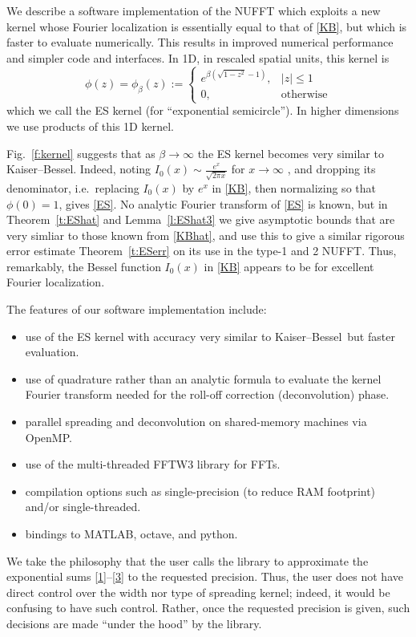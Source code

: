 \documentclass[10pt]{article}
\newcommand{\bi}{\begin{itemize}}
\newcommand{\ei}{\end{itemize}}
\newcommand{\be}{\begin{equation}}
\newcommand{\ee}{\end{equation}}
\newcommand{\freq}{\beta}          %
\newcommand{\KB}{Kaiser--Bessel}
\begin{document}
We describe a software implementation of the NUFFT
which exploits a new kernel whose Fourier localization 
is essentially equal to that of \eqref{KB},
but which is faster to evaluate numerically.
This results in improved numerical performance and simpler code and interfaces.
In 1D, in rescaled spatial units, this kernel is
\be
\phi(z) = \phi_\freq(z) :=
\left\{\begin{array}{ll}
e^{\freq (\sqrt{1-z^2}-1)}, & |z|\le 1\\
0, & \mbox{otherwise}
\end{array}
\right.
\label{ES}
\ee
which we call the ES kernel (for %
``exponential semicircle'').
In higher dimensions we use products of this 1D kernel.

Fig.~\ref{f:kernel} suggests that as $\freq\to\infty$ the ES kernel
becomes very similar to \KB.
Indeed, noting
$I_0(x) \sim \frac{e^x}{\sqrt{2\pi x}}$ for $x\to\infty$ \cite[(10.30.4)]{dlmf},
and dropping its denominator, i.e.\ replacing $I_0(x)$ by $e^x$ in \eqref{KB},
then normalizing so that $\phi(0)=1$, gives \eqref{ES}.
No analytic Fourier transform of \eqref{ES} is known,
but in Theorem~\ref{t:EShat} and Lemma~\ref{l:EShat3}
we give asymptotic bounds that are very simliar to those known
from \eqref{KBhat}, and use this to give a similar 
rigorous error estimate Theorem~\ref{t:ESerr}
on its use in the type-1 and 2 NUFFT.
Thus, remarkably, the Bessel function $I_0(x)$ in \eqref{KB}
appears to be for excellent Fourier localization.

The features of our software implementation include:
\bi
\item use of the ES kernel with accuracy very similar to \KB\ but
  faster evaluation.
\item use of quadrature rather than an analytic formula to evaluate
  the kernel Fourier transform needed for the roll-off correction
  (deconvolution) phase.
\item parallel spreading and deconvolution on shared-memory machines via OpenMP.
\item use of the multi-threaded FFTW3 library for FFTs.
\item compilation options such as single-precision (to reduce RAM footprint)
  and/or single-threaded.
\item bindings to MATLAB, octave, and python.
\ei

We take the philosophy that the user calls the library to approximate the
exponential sums \eqref{1}--\eqref{3} to the requested precision.
Thus, the user does not have direct control over the width nor type of
spreading kernel; indeed, it would be confusing to have such control.
Rather, once the requested precision is given, such decisions
are made ``under the hood'' by the library.
\end{document}
